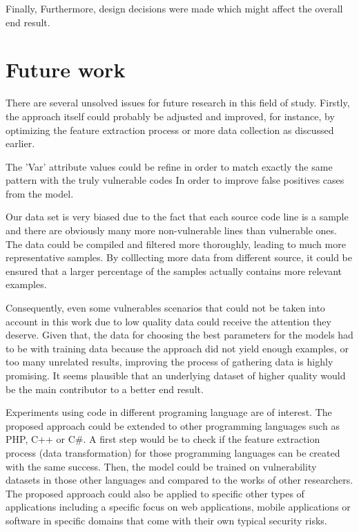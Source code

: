 Finally,  Furthermore, design decisions were made which might affect the overall end result.



\section{Future work} %
\label{sec:Future_work}

There are several unsolved issues for future research in this field of study. Firstly, the approach itself could probably be adjusted and improved, for instance, by optimizing the feature extraction process or more data collection as discussed earlier. 

The 'Var' attribute values could be refine in order to match exactly the same pattern with the truly vulnerable codes In order to improve false positives cases from the model.

Our data set is very biased due to the fact that each source code line is a sample and there are obviously many more non-vulnerable lines than vulnerable ones. The data could be compiled and filtered more thoroughly, leading to much more representative samples. By colllecting more data from different source, it could be ensured that a larger percentage of the samples actually contains more relevant examples.

Consequently, even some vulnerables scenarios that could not be taken into account in this work due to low quality data could receive the attention they deserve. Given that, the data for choosing the best parameters for the models had to be with training data because the approach did not yield enough examples, or too many unrelated results, improving the process of gathering data is highly promising. It seems plausible that an underlying dataset of higher quality would be the main contributor to a better end result.

Experiments using code in different programing language are of interest. The proposed approach could be extended to other programming languages such as PHP, C++ or C\#.
A first step would be to check if the feature extraction process (data transformation) for those programming languages can be created with the same success. Then, the model could be trained on vulnerability datasets in those other languages and compared to the works of other researchers.
The proposed approach could also be applied to specific other types of applications including a specific focus on web applications, mobile applications or software in specific domains that come with their own typical security risks.

